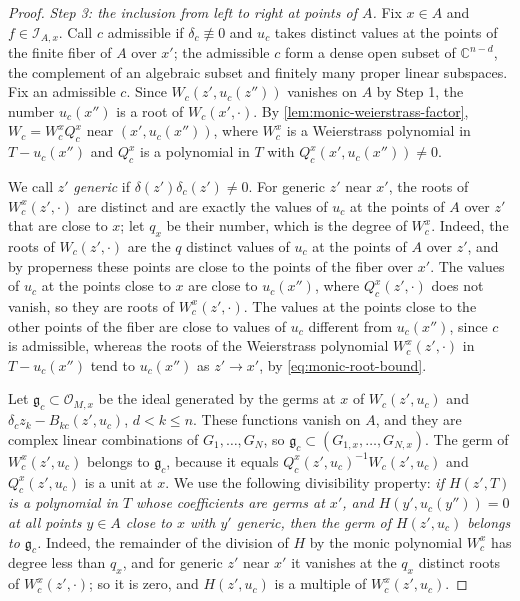 \begin{proof}
\emph{Step 3: the inclusion from left to right at points of $A$.} Fix $x\in A$ and $f\in\mathcal I_{A,x}$. Call $c$ admissible if $\delta_c\not\equiv0$ and $u_c$ takes distinct values at the points of the finite fiber of $A$ over $x'$; the admissible $c$ form a dense open subset of $\mathbb C^{n-d}$, the complement of an algebraic subset and finitely many proper linear subspaces. Fix an admissible $c$. Since $W_c(z',u_c(z''))$ vanishes on $A$ by Step 1, the number $u_c(x'')$ is a root of $W_c(x',\cdot)$. By \cref{lem:monic-weierstrass-factor}, $W_c=W_c^xQ_c^x$ near $(x',u_c(x''))$, where $W^x_c$ is a Weierstrass polynomial in $T-u_c(x'')$ and $Q^x_c$ is a polynomial in $T$ with $Q^x_c(x',u_c(x''))\neq0$.

We call $z'$ \emph{generic} if $\delta(z')\delta_c(z')\neq0$. For generic $z'$ near $x'$, the roots of $W^x_c(z',\cdot)$ are distinct and are exactly the values of $u_c$ at the points of $A$ over $z'$ that are close to $x$; let $q_x$ be their number, which is the degree of $W^x_c$. Indeed, the roots of $W_c(z',\cdot)$ are the $q$ distinct values of $u_c$ at the points of $A$ over $z'$, and by properness these points are close to the points of the fiber over $x'$. The values of $u_c$ at the points close to $x$ are close to $u_c(x'')$, where $Q^x_c(z',\cdot)$ does not vanish, so they are roots of $W^x_c(z',\cdot)$. The values at the points close to the other points of the fiber are close to values of $u_c$ different from $u_c(x'')$, since $c$ is admissible, whereas the roots of the Weierstrass polynomial $W^x_c(z',\cdot)$ in $T-u_c(x'')$ tend to $u_c(x'')$ as $z'\to x'$, by \eqref{eq:monic-root-bound}.

Let $\mathfrak g_c\subset\mathcal O_{M,x}$ be the ideal generated by the germs at $x$ of $W_c(z',u_c)$ and $\delta_cz_k-B_{kc}(z',u_c)$, $d<k\leq n$. These functions vanish on $A$, and they are complex linear combinations of $G_1,\ldots,G_N$, so $\mathfrak g_c\subset(G_{1,x},\ldots,G_{N,x})$. The germ of $W^x_c(z',u_c)$ belongs to $\mathfrak g_c$, because it equals $Q^x_c(z',u_c)^{-1}W_c(z',u_c)$ and $Q^x_c(z',u_c)$ is a unit at $x$. We use the following divisibility property: \emph{if $H(z',T)$ is a polynomial in $T$ whose coefficients are germs at $x'$, and $H(y',u_c(y''))=0$ at all points $y\in A$ close to $x$ with $y'$ generic, then the germ of $H(z',u_c)$ belongs to $\mathfrak g_c$.} Indeed, the remainder of the division of $H$ by the monic polynomial $W^x_c$ has degree less than $q_x$, and for generic $z'$ near $x'$ it vanishes at the $q_x$ distinct roots of $W^x_c(z',\cdot)$; so it is zero, and $H(z',u_c)$ is a multiple of $W^x_c(z',u_c)$.


\end{proof}
